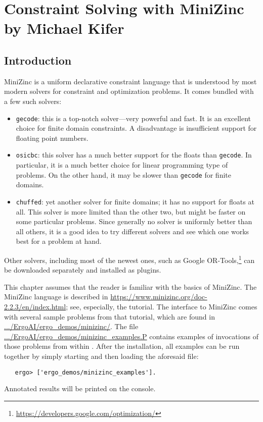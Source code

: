 
\chapter[Constraint Solving]
{Constraint Solving with MiniZinc\\
  \Large by Michael Kifer}



\section{Introduction}

MiniZinc is a uniform declarative constraint language that is understood by
most modern solvers for constraint and optimization problems. It comes bundled with a few such solvers:
\begin{itemize}
\item \texttt{gecode}: this is a top-notch solver---very powerful and fast.
  It is an excellent choice for finite domain constraints.
  A disadvantage is insufficient support for floating point numbers.
\item  \texttt{osicbc}: this solver has a much better support for the
  floats than \texttt{gecode}. In particular, it is a much better choice
  for linear programming type of problems. On the other hand, it may be
  slower than \texttt{gecode} for finite domains.  
\item \texttt{chuffed}: yet another solver for finite domains; it has no
  support for floats at all. This solver is more limited than the other
  two, but might be faster on some particular problems. Since generally no
  solver is uniformly better than all others, it is a good idea to try
  different solvers and see which one works best for a problem at hand.
\end{itemize}
Other solvers,
including most of the newest ones, such as Google OR-Tools,\footnote{
  \url{https://developers.google.com/optimization/}
  }
can be downloaded separately and installed as plugins.

This chapter assumes that the reader is familiar with the basics of MiniZinc.
The MiniZinc language is described in
\url{https://www.minizinc.org/doc-2.2.3/en/index.html}; see, especially, the
tutorial. 
The \FLSYSTEM interface to MiniZinc comes with several sample problems from that
tutorial, which are found in \url{.../ErgoAI/ergo_demos/minizinc/}.
The file \url{.../ErgoAI/ergo_demos/minizinc_examples.P} contains examples of
invocations of those problems from within \FLSYSTEM. After the
installation, all examples can be run together
by simply starting \FLSYSTEM and then loading the aforesaid file:
\begin{verbatim}
   ergo> ['ergo_demos/minizinc_examples'].
\end{verbatim}
Annotated results will be printed on the console.

